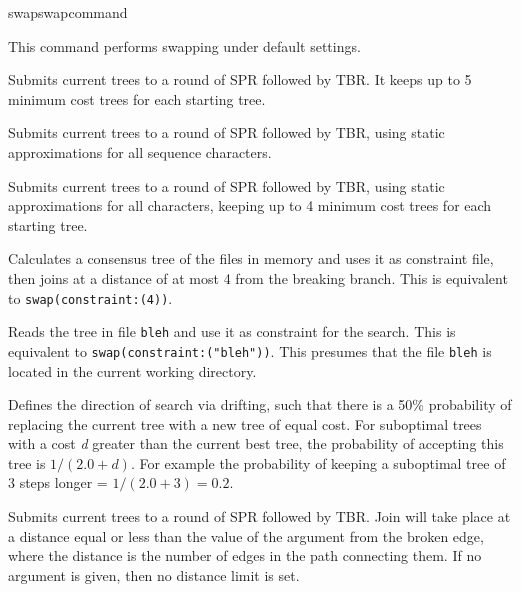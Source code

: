 \begin{command}{swap}{swapcommand}
\begin{arguments}
\end{arguments}


\begin{poyexamples} 
{This command performs swapping under default settings.}

{Submits current trees to a round of SPR followed by TBR. It keeps
up to 5 minimum cost trees for each starting tree.}

{Submits current trees to a round of SPR followed by TBR, using
static approximations for all sequence characters.}

{Submits current trees to a round of SPR followed by TBR, using
static approximations for all characters, keeping up to 4 minimum
cost trees for each starting tree.}

{Calculates a consensus tree of the files in memory and uses it as
constraint file, then joins at a distance of at most 4 from the breaking
branch. This is equivalent to \texttt{swap(constraint:(4))}.}

{Reads the tree in file \texttt{bleh} and use it as constraint for the
search. This is equivalent to \texttt{swap(constraint:("bleh"))}. This 
presumes that the file \texttt{bleh} is located in the current working directory.}	

{Defines the direction of search via drifting, such that there is a 50\% probability of 
replacing the current tree with a new tree of equal cost. For suboptimal trees with 
a cost \emph{d} greater than the current best tree, the probability of accepting this tree 
is $1 / (2.0 + d)$. For example the
probability of keeping a suboptimal tree of 3 steps longer = $1 / (2.0 + 3) = 0.2$.}

{Submits current trees to a round of SPR followed by TBR. Join will take place
at a distance equal or less than the value of the argument from the broken edge, 
where the distance is the number of edges in the path connecting them. If no 
argument is given, then no distance limit is set.}


\end{poyexamples}
\end{command}
